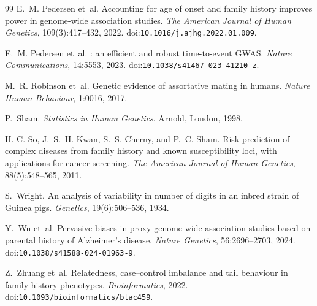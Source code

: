 \documentclass[11pt,a4paper]{article}
\newcommand{\doi}[1]{doi:\allowbreak\texttt{#1}}
\begin{document}
\begin{thebibliography}{99}
E.~M. Pedersen et~al.
\newblock Accounting for age of onset and family history improves power
  in genome-wide association studies.
\newblock \emph{The American Journal of Human Genetics},
  109(3):417--432, 2022.
\newblock \doi{10.1016/j.ajhg.2022.01.009}.

E.~M. Pedersen et~al.
: an efficient and robust time-to-event {GWAS}.
\newblock \emph{Nature Communications}, 14:5553, 2023.
\newblock \doi{10.1038/s41467-023-41210-z}.

M.~R. Robinson et~al.
\newblock Genetic evidence of assortative mating in humans.
\newblock \emph{Nature Human Behaviour}, 1:0016, 2017.

P.~Sham.
\newblock \emph{Statistics in Human Genetics}.
\newblock Arnold, London, 1998.

H.-C. So, J.~S.~H. Kwan, S.~S. Cherny, and P.~C. Sham.
\newblock Risk prediction of complex diseases from family history and
  known susceptibility loci, with applications for cancer screening.
\newblock \emph{The American Journal of Human Genetics},
  88(5):548--565, 2011.

S.~Wright.
\newblock An analysis of variability in number of digits in an inbred
  strain of {G}uinea pigs.
\newblock \emph{Genetics}, 19(6):506--536, 1934.

Y.~Wu et~al.
\newblock Pervasive biases in proxy genome-wide association studies based
  on parental history of {A}lzheimer's disease.
\newblock \emph{Nature Genetics}, 56:2696--2703, 2024.
\newblock \doi{10.1038/s41588-024-01963-9}.

Z.~Zhuang et~al.
\newblock Relatedness, case--control imbalance and tail behaviour in
  family-history phenotypes.
\newblock \emph{Bioinformatics}, 2022.
\newblock \doi{10.1093/bioinformatics/btac459}.

\end{thebibliography}
\end{document}
